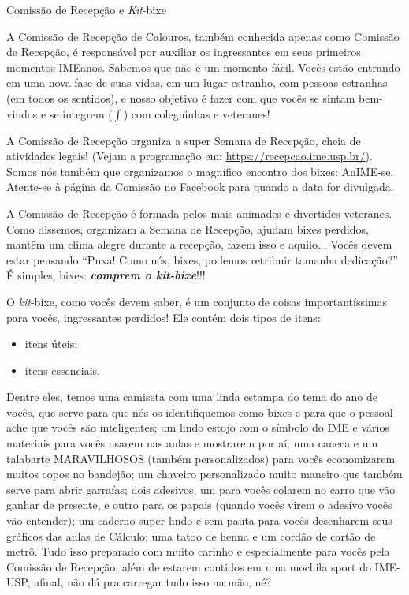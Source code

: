 \begin{secao}{Comissão de Recepção e \textit{Kit}-bixe}

A Comissão de Recepção de Calouros, também conhecida apenas como Comissão de
Recepção, é responsável por auxiliar os ingressantes em seus primeiros momentos
IMEanos. Sabemos que não é um momento fácil. Vocês estão entrando em uma nova fase
de suas vidas, em um lugar estranho, com pessoas estranhas (em todos os sentidos),
e nosso objetivo é fazer com que vocês se sintam bem-vindos e se integrem
($\int$) com coleguinhas e veteranes!

A Comissão de Recepção organiza a super Semana de Recepção, cheia de atividades
legais! (Vejam a programação em: \url{https://recepcao.ime.usp.br/}).
Somos nós também que organizamos o magnífico encontro dos bixes: AnIME-se.
Atente-se à página da Comissão no Facebook para quando a data for divulgada. %

A Comissão de Recepção é formada pelos mais animades e divertides veteranes. Como
dissemos, organizam a Semana de Recepção, ajudam bixes perdidos, mantêm um clima
alegre durante a recepção, fazem isso e aquilo...
Vocês devem estar pensando ``Puxa! Como nós, bixes, podemos retribuir
tamanha dedicação?'' É simples, bixes: {\bf\em comprem o \textit{kit}-bixe}!!!

O \textit{kit}-bixe, como vocês devem saber, é um conjunto de coisas
importantíssimas para vocês, ingressantes perdidos! Ele contém dois tipos de
itens:
\begin{itemize}
\item itens úteis;
\item itens essenciais.
\end{itemize} %
Dentre eles, temos uma camiseta com uma linda estampa do tema do ano de vocês,
que serve para que nós os identifiquemos como bixes e para que o pessoal
ache que vocês são inteligentes; um lindo estojo com o símbolo do IME e vários 
materiais para vocês usarem nas aulas e mostrarem por aí; uma caneca e 
um talabarte MARAVILHOSOS (também personalizados) para vocês economizarem muitos 
copos no bandejão; um chaveiro personalizado muito maneiro que também serve para 
abrir garrafas; dois adesivos, um para vocês colarem no carro que vão ganhar de 
presente, e outro para os papais (quando vocês virem o adesivo vocês vão entender); 
um caderno super lindo e sem pauta para vocês desenharem seus gráficos das aulas 
de Cálculo; uma tatoo de henna e um cordão de cartão de metrô. 
Tudo isso preparado com muito carinho e especialmente para vocês pela 
Comissão de Recepção, além de estarem contidos em uma mochila sport do IME-USP, 
afinal, não dá pra carregar tudo isso na mão, né?


\end{secao}
